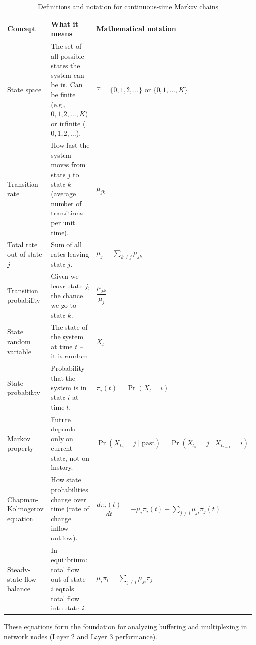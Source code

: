 \begin{table}[h!]
\centering
\begin{tabular}{>{\raggedright\arraybackslash}p{3.5cm} 
                >{\raggedright\arraybackslash}p{7cm} 
                >{\raggedright\arraybackslash}p{4cm}}
\toprule
\textbf{Concept} & \textbf{What it means} & \textbf{Mathematical notation} \\
\midrule
State space & The set of all possible states the system can be in. Can be finite (e.g., \(0,1,2,\dots,K\)) or infinite (\(0,1,2,\dots\)). & \(\mathbb{E} = \{0,1,2,\dots\}\) or \(\{0,1,\dots,K\}\) \\
\hline
Transition rate & How fast the system moves from state \(j\) to state \(k\) (average number of transitions per unit time). & \(\mu_{jk}\) \\
\hline
Total rate out of state \(j\) & Sum of all rates leaving state \(j\). & \(\mu_j = \sum_{k \neq j} \mu_{jk}\) \\
\hline
Transition probability & Given we leave state \(j\), the chance we go to state \(k\). & \(\dfrac{\mu_{jk}}{\mu_j}\) \\
\hline
State random variable & The state of the system at time \(t\) – it is random. & \(X_t\) \\
\hline
State probability & Probability that the system is in state \(i\) at time \(t\). & \(\pi_i(t) = \Pr(X_t = i)\) \\
\hline
Markov property & Future depends only on current state, not on history. & \(\Pr(X_{t_n}=j \mid \text{past}) = \Pr(X_{t_n}=j \mid X_{t_{n-1}}=i)\) \\
\hline
Chapman-Kolmogorov equation & How state probabilities change over time (rate of change = inflow \(-\) outflow). & \(\dfrac{d\pi_i(t)}{dt} = -\mu_i \pi_i(t) + \sum_{j \neq i} \mu_{ji} \pi_j(t)\) \\
\hline
Steady-state flow balance & In equilibrium: total flow out of state \(i\) equals total flow into state \(i\). & \(\mu_i \pi_i = \sum_{j \neq i} \mu_{ji} \pi_j\) \\
\bottomrule
\end{tabular}
\caption{Definitions and notation for continuous-time Markov chains}
\end{table}

\noindent
These equations form the foundation for analyzing buffering and multiplexing in network nodes (Layer 2 and Layer 3 performance).


